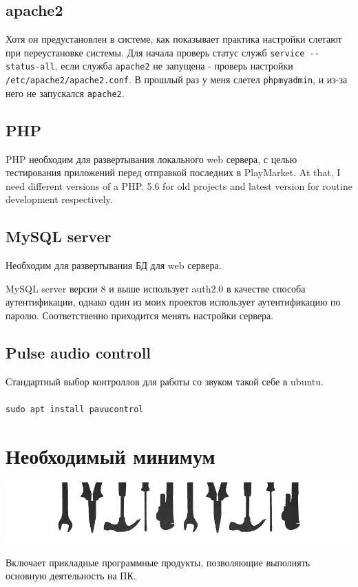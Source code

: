 \documentclass[a4paper, 12pt]{report}
\begin{document}
\subsection{apache2} Хотя он предустановлен в системе, как показывает практика настройки слетают при переустановке системы. Для начала проверь статус служб
\lstinline|service --status-all|, если служба \lstinline|apache2| не запущена - проверь настройки \lstinline|/etc/apache2/apache2.conf|. В прошлый раз у меня слетел \lstinline|phpmyadmin|, и из-за него не запускался \lstinline|apache2|.
\subsection{PHP} PHP необходим для развертывания локального web сервера, с целью тестирования приложений перед отправкой последних в PlayMarket. At that, I need different versions of a PHP. 5.6 for old projects and latest version for routine development respectively.

\subsection{MySQL server} Необходим для развертывания БД для web сервера.

 MySQL server версии 8 и выше использует auth2.0 в качестве способа аутентификации, однако один из моих проектов использует аутентификацию по паролю. Соответственно приходится менять настройки сервера.
\subsection{Pulse audio controll} Стандартный выбор контроллов для работы со звуком такой себе в ubuntu. 
\\\\
\lstinline|sudo apt install pavucontrol|

\clearpage
\section{Необходимый минимум} 
\begin{center}
	\includegraphics[scale=0.6]{labor}
\end{center} 
Включает прикладные программные продукты, позволяющие выполнять основную деятельность на ПК.
\end{document}
